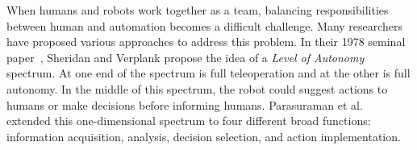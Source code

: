 
When humans and robots work together as a team, balancing responsibilities between human and automation becomes a difficult challenge. Many researchers have proposed various approaches to address this problem. In their 1978 seminal paper~\cite{Sheridan1978Human}, Sheridan and Verplank propose the idea of a \textit{Level of Autonomy} spectrum. At one end of the spectrum is full teleoperation and at the other is full autonomy. In the middle of this spectrum, the robot could suggest actions to humans or make decisions before informing humans. Parasuraman et al.\ \cite{Parasuraman2000Model} extended this one-dimensional spectrum to four different broad functions: information acquisition, analysis, decision selection, and action implementation. 

